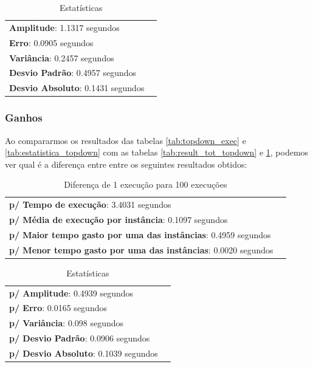 \documentclass[a4paper, 12pt]{article}
\begin{document}

\begin{table}[!htb]
    \begin{tabular}{ll}
        {\bf Amplitude}: 1.1317 segundos\\
        {\bf Erro}: 0.0905 segundos\\
        {\bf Variância}: 0.2457 segundos\\
        {\bf Desvio Padrão}: 0.4957 segundos\\
        {\bf Desvio Absoluto}: 0.1431 segundos
    \end{tabular}
    \caption{Estatísticas}
    \label{tab:estatistica_tot_topdown}
\end{table}

\subsubsection{Ganhos}

Ao compararmos os resultados das tabelas \ref{tab:topdown_exec} e \ref{tab:estatistica_topdown} com as 
tabelas \ref{tab:result_tot_topdown} e \ref{tab:estatistica_tot_topdown}, podemos ver qual é a diferença entre 
entre os seguintes resultados obtidos:
\begin{table}[!htb]
    \begin{tabular}{ll}
        {\bf p/ Tempo de execução}: 3.4031 segundos\\
        {\bf p/ Média de execução por instância}: 0.1097 segundos\\
        {\bf p/ Maior tempo gasto por uma das instâncias}: 0.4959 segundos\\
        {\bf p/ Menor tempo gasto por uma das instâncias}: 0.0020 segundos \\
    \end{tabular}
    \caption{Diferença de 1 execução para 100 execuções}
    \label{tab:diff_topdown}
\end{table}


\begin{table}[!htb]
    \begin{tabular}{ll}
        {\bf p/ Amplitude}: 0.4939 segundos\\
        {\bf p/ Erro}: 0.0165 segundos\\
        {\bf p/ Variância}: 0.098 segundos\\
        {\bf p/ Desvio Padrão}: 0.0906 segundos\\
        {\bf p/ Desvio Absoluto}: 0.1039 segundos
    \end{tabular}
    \caption{Estatísticas}
    \label{tab:diff_estatistica_topdown}
\end{table}
\end{document}
